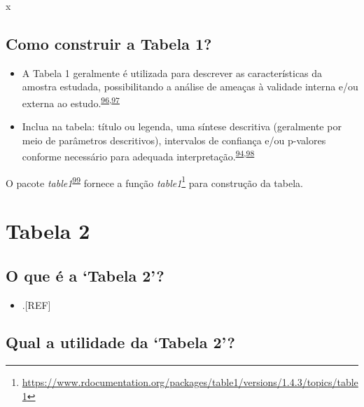 \documentclass[
  a4paper,
]{book}
\providecommand{\tightlist}{%
  \setlength{\itemsep}{0pt}\setlength{\parskip}{0pt}}
\renewcommand{\href}[2]{#2\footnote{\url{#1}}}
\newenvironment{infobox}[1]
  {
  \begin{itemize}
  \renewcommand{\labelitemi}{
    \raisebox{-.7\height}[0pt][0pt]{
      {\setkeys{Gin}{width=3em,keepaspectratio}
        \texttt{[image: \#1]}}
    }
  }
  \setlength{\fboxsep}{1em}
  \begin{blackbox}
  \item
  }
  {
  \end{blackbox}
  \end{itemize}
  }
\begin{document}
x

\hypertarget{como-construir-a-tabela-1}{%
\subsection{Como construir a Tabela 1?}\label{como-construir-a-tabela-1}}

\begin{itemize}
\item
  A Tabela 1 geralmente é utilizada para descrever as características da amostra estudada, possibilitando a análise de ameaças à validade interna e/ou externa ao estudo.\textsuperscript{\protect\hyperlink{ref-greenhalgh1997}{96},\protect\hyperlink{ref-Hayes-Larson2019}{97}}
\item
  Inclua na tabela: título ou legenda, uma síntese descritiva (geralmente por meio de parâmetros descritivos), intervalos de confiança e/ou p-valores conforme necessário para adequada interpretação.\textsuperscript{\protect\hyperlink{ref-Inskip2017}{94},\protect\hyperlink{ref-Kwak2021}{98}}
\end{itemize}

\begin{infobox}{images/Rlogo}
O pacote \emph{table1}\textsuperscript{\protect\hyperlink{ref-table1}{99}} fornece a função \href{https://www.rdocumentation.org/packages/table1/versions/1.4.3/topics/table1}{\emph{table1}} para construção da tabela.

\end{infobox}

\hypertarget{tabela-2}{%
\section{Tabela 2}\label{tabela-2}}

\hypertarget{o-que-uxe9-a-tabela-2}{%
\subsection{O que é a `Tabela 2'?}\label{o-que-uxe9-a-tabela-2}}

\begin{itemize}
\tightlist
\item
  .{[}REF{]}
\end{itemize}

\hypertarget{qual-a-utilidade-da-tabela-2}{%
\subsection{Qual a utilidade da `Tabela 2'?}\label{qual-a-utilidade-da-tabela-2}}
\end{document}
